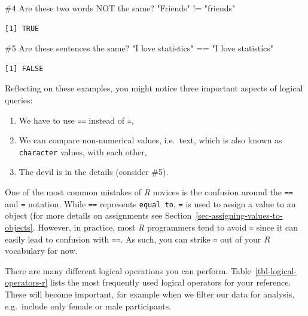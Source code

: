 \documentclass[
  letterpaper,
]{krantz}
\makeatletter
\newenvironment{Shaded}{\begin{snugshade}}{\end{snugshade}}
\newcommand{\CommentTok}[1]{\textcolor[rgb]{0.37,0.37,0.37}{#1}}
\newcommand{\SpecialCharTok}[1]{\textcolor[rgb]{0.37,0.37,0.37}{#1}}
\newcommand{\StringTok}[1]{\textcolor[rgb]{0.13,0.47,0.30}{#1}}
\providecommand{\tightlist}{%
  \setlength{\itemsep}{0pt}\setlength{\parskip}{0pt}}\usepackage{longtable,booktabs,array}
\newenvironment{kframe}{%
\medskip{}
\setlength{\fboxsep}{.8em}
 \def\at@end@of@kframe{}%
 \ifinner\ifhmode%
  \def\at@end@of@kframe{\end{minipage}}%
  \begin{minipage}{\columnwidth}%
 \fi\fi%
 \def\FrameCommand##1{\hskip\@totalleftmargin \hskip-\fboxsep
 \colorbox{shadecolor}{##1}\hskip-\fboxsep
     \hskip-\linewidth \hskip-\@totalleftmargin \hskip\columnwidth}%
 \MakeFramed {\advance\hsize-\width
   \@totalleftmargin\z@ \linewidth\hsize
   \@setminipage}}%
 {\par\unskip\endMakeFramed%
 \at@end@of@kframe}
\renewenvironment{Shaded}{\begin{kframe}}{\end{kframe}}
\makeatother
\begin{document}
\begin{Shaded}
\begin{Highlighting}[]
\CommentTok{\#4 Are these two words NOT the same?}
\StringTok{"Friends"} \SpecialCharTok{!=} \StringTok{"friends"}
\end{Highlighting}
\end{Shaded}

\begin{verbatim}
[1] TRUE
\end{verbatim}

\begin{Shaded}
\begin{Highlighting}[]
\CommentTok{\#5 Are these sentences the same?}
\StringTok{"I love statistics"} \SpecialCharTok{==} \StringTok{"I love statistícs"}
\end{Highlighting}
\end{Shaded}

\begin{verbatim}
[1] FALSE
\end{verbatim}

Reflecting on these examples, you might notice three important aspects
of logical queries:

\begin{enumerate}
\def\labelenumi{\arabic{enumi}.}
\tightlist
\item
  We have to use \texttt{==} instead of \texttt{=},
\item
  We can compare non-numerical values, i.e.~text, which is also known as
  \texttt{character} values, with each other,
\item
  The devil is in the details (consider \#5).
\end{enumerate}

One of the most common mistakes of \emph{R} novices is the confusion
around the \texttt{==} and \texttt{=} notation. While \texttt{==}
represents \texttt{equal\ to}, \texttt{=} is used to assign a value to
an object (for more details on assignments see
Section~\ref{sec-assigning-values-to-objects}. However, in practice,
most \emph{R} programmers tend to avoid \texttt{=} since it can easily
lead to confusion with \texttt{==}. As such, you can strike \texttt{=}
out of your \emph{R} vocabulary for now.

There are many different logical operations you can perform.
Table~\ref{tbl-logical-operators-r} lists the most frequently used
logical operators for your reference. These will become important, for
example when we filter our data for analysis, e.g.~include only female
or male participants.
\end{document}
